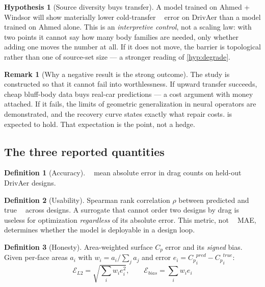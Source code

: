 \documentclass[10pt,a4paper]{article}
\theoremstyle{definition}
\newtheorem{definition}{Definition}[section]
\newtheorem{hypothesis}{Hypothesis}[section]
\newtheorem{remark}{Remark}[section]
\DeclareMathOperator{\Cd}{C_d}
\newcommand{\Cp}{{C_p}}
\begin{document}
\begin{hypothesis}[Source diversity buys transfer]
\label{hyp:diversity}
A model trained on Ahmed + Windsor will show materially lower cold-transfer $\Cd$
error on DrivAer than a model trained on Ahmed alone. This is an
\emph{interpretive control}, not a scaling law: with two points it cannot say how many
body families are needed, only whether adding one moves the number at all. If it does
not move, the barrier is topological rather than one of source-set size --- a stronger
reading of \cref{hyp:degrade}.
\end{hypothesis}

\begin{remark}[Why a negative result is the strong outcome]
The study is constructed so that it cannot fail into worthlessness. If upward
transfer succeeds, cheap bluff-body data buys real-car predictions --- a cost
argument with money attached. If it fails, the limits of geometric generalization
in neural operators are demonstrated, and the recovery curve states exactly what
repair costs.  is expected to hold. That expectation is the
point, not a hedge.
\end{remark}

\subsection{The three reported quantities}

\begin{definition}[Accuracy]
$\Cd$ mean absolute error in drag counts on held-out DrivAer designs.
\end{definition}

\begin{definition}[Usability]
\label{def:rank}
Spearman rank correlation $\rho$ between predicted and true $\Cd$ across designs.
A surrogate that cannot order two designs by drag is useless for optimization
\emph{regardless} of its absolute error. This metric, not $\Cd$ MAE, determines
whether the model is deployable in a design loop.
\end{definition}

\begin{definition}[Honesty]
\label{def:honesty}
Area-weighted surface $\Cp$ error and its \emph{signed} bias. Given per-face
areas $a_i$ with $w_i = a_i / \sum_j a_j$ and error $e_i = \Cp^{pred}_i -
\Cp^{true}_i$:
\begin{equation}
\mathcal{E}_{L2} = \sqrt{\textstyle\sum_i w_i e_i^2},
\qquad
\mathcal{E}_{bias} = \textstyle\sum_i w_i e_i
\label{eq:honesty}
\end{equation}
\end{definition}
\end{document}
